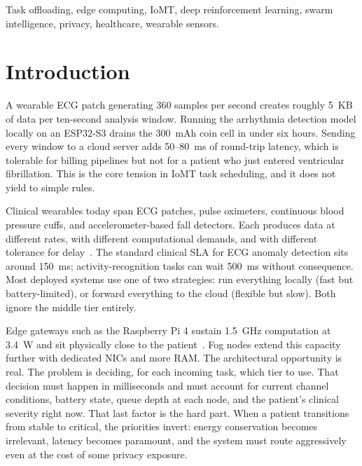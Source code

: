 \documentclass[journal]{IEEEtran}
\begin{document}
\begin{IEEEkeywords}
Task offloading, edge computing, IoMT, deep reinforcement learning,
swarm intelligence, privacy, healthcare, wearable sensors.
\end{IEEEkeywords}

\section{Introduction}
\label{sec:intro}

A wearable ECG patch generating 360 samples per second creates roughly
5~KB of data per ten-second analysis window. Running the arrhythmia
detection model locally on an ESP32-S3 drains the 300~mAh coin cell in
under six hours. Sending every window to a cloud server adds 50--80~ms
of round-trip latency, which is tolerable for billing pipelines but not
for a patient who just entered ventricular fibrillation. This is the
core tension in IoMT task scheduling, and it does not yield to simple
rules.

Clinical wearables today span ECG patches, pulse oximeters, continuous
blood pressure cuffs, and accelerometer-based fall detectors. Each
produces data at different rates, with different computational demands,
and with different tolerance for delay~\cite{moody2001mitbih}. The
standard clinical SLA for ECG anomaly detection sits around 150~ms;
activity-recognition tasks can wait 500~ms without consequence. Most
deployed systems use one of two strategies: run everything locally
(fast but battery-limited), or forward everything to the cloud
(flexible but slow). Both ignore the middle tier entirely.

Edge gateways such as the Raspberry Pi 4 sustain 1.5~GHz computation
at 3.4~W and sit physically close to the patient~\cite{rpi4_specs}.
Fog nodes extend this capacity further with dedicated NICs and more
RAM. The architectural opportunity is real. The problem is deciding,
for each incoming task, which tier to use. That decision must happen in
milliseconds and must account for current channel conditions, battery
state, queue depth at each node, and the patient's clinical severity
right now. That last factor is the hard part. When a patient
transitions from stable to critical, the priorities invert: energy
conservation becomes irrelevant, latency becomes paramount, and the
system must route aggressively even at the cost of some privacy
exposure.
\end{document}
